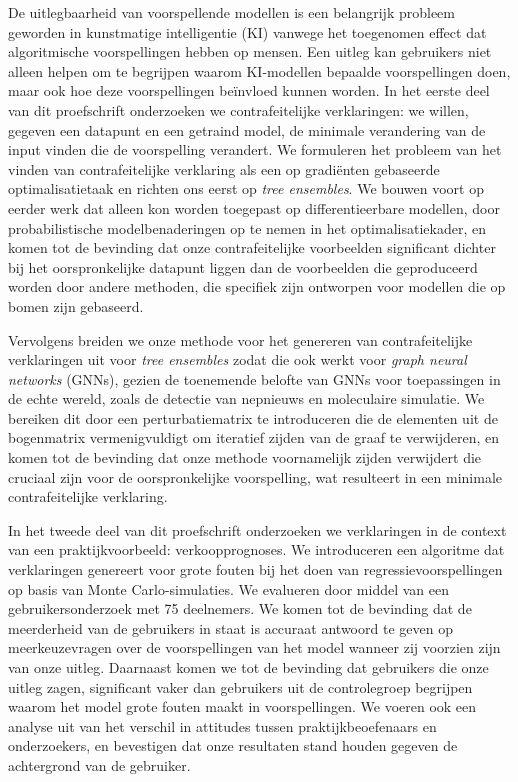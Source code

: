 De uitlegbaarheid van voorspellende modellen is een belangrijk probleem geworden in kunstmatige intelligentie (KI) vanwege het toegenomen effect dat algoritmische voorspellingen hebben op mensen.
Een uitleg kan gebruikers niet alleen helpen om te begrijpen waarom KI-modellen bepaalde voorspellingen doen, maar ook hoe deze voorspellingen be\"{i}nvloed kunnen worden. 
In het eerste deel van dit proefschrift onderzoeken we contrafeitelijke verklaringen: we willen, gegeven een datapunt en een getraind model, de minimale verandering van de input vinden die de voorspelling verandert. 
We formuleren het probleem van het vinden van contrafeitelijke verklaring als een op gradi\"enten gebaseerde optimalisatietaak en richten ons eerst op \textit{tree ensembles}. 
We bouwen voort op eerder werk dat alleen kon worden toegepast op differentieerbare modellen, door probabilistische modelbenaderingen op te nemen in het optimalisatiekader, en komen tot de bevinding dat onze contrafeitelijke voorbeelden significant dichter bij het oorspronkelijke datapunt liggen dan de voorbeelden die geproduceerd worden door andere methoden, die specifiek zijn ontworpen voor modellen die op bomen zijn gebaseerd.
 
Vervolgens breiden we onze methode voor het genereren van contrafeitelijke verklaringen uit voor \emph{tree ensembles} zodat die ook werkt voor \textit{graph neural networks} (GNNs), gezien de toenemende belofte van GNNs voor toepassingen in de echte wereld, zoals de detectie van nepnieuws en moleculaire simulatie.
We bereiken dit door een perturbatiematrix te introduceren die de elementen uit de bogenmatrix vermenigvuldigt om iteratief zijden van de graaf te verwijderen, en komen tot de bevinding dat onze methode voornamelijk zijden verwijdert die cruciaal zijn voor de oorspronkelijke voorspelling, wat resulteert in een minimale contrafeitelijke verklaring.
 
In het tweede deel van dit proefschrift onderzoeken we verklaringen in de context van een praktijkvoorbeeld: verkoopprognoses. We introduceren een algoritme dat verklaringen genereert voor grote fouten bij het doen van regressievoorspellingen op basis van Monte Carlo-simulaties. We evalueren door middel van een gebruikersonderzoek met 75 deelnemers. We komen tot de bevinding dat de meerderheid van de gebruikers in staat is accuraat antwoord te geven op meerkeuzevragen over de voorspellingen van het model wanneer zij voorzien zijn van onze uitleg. Daarnaast komen we tot de bevinding dat gebruikers die onze uitleg zagen, significant vaker dan gebruikers uit de controlegroep begrijpen waarom het model grote fouten maakt in voorspellingen. We voeren ook een analyse uit van het verschil in attitudes tussen praktijkbeoefenaars en onderzoekers, en bevestigen dat onze resultaten stand houden gegeven de achtergrond van de gebruiker. 
 
